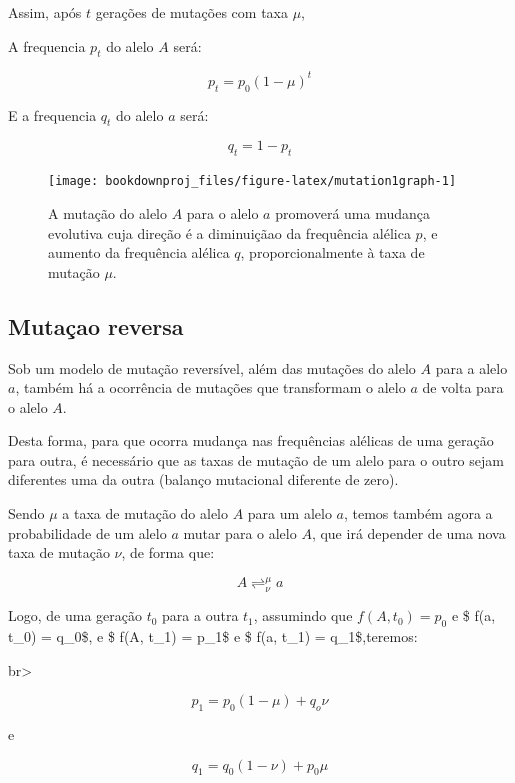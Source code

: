 \documentclass[
]{book}
\begin{document}
Assim, após \(t\) gerações de mutações com taxa \(\mu\),

A frequencia \(p_t\) do alelo \(A\) será:

\[ p_t = p_0 \left( 1 - \mu \right)^t \]

E a frequencia \(q_t\) do alelo \(a\) será:

\[ q_t = 1 - p_t\]

\begin{figure}

{\centering \texttt{[image: bookdownproj\_files/figure-latex/mutation1graph-1]} 

}

\caption{A mutação do alelo $A$ para o alelo $a$ promoverá uma mudança evolutiva cuja direção é a diminuiçãao da frequência alélica $p$, e aumento da frequência alélica $q$,  proporcionalmente à taxa de mutação $μ$.}\label{fig:mutation1graph}
\end{figure}

\hypertarget{mutauxe7ao-reversa}{%
\subsection{Mutaçao reversa}\label{mutauxe7ao-reversa}}

Sob um modelo de mutação reversível, além das mutações do alelo \(A\) para a alelo \(a\), também há a ocorrência de mutações que transformam o alelo \(a\) de volta para o alelo \(A\).

Desta forma, para que ocorra mudança nas frequências alélicas de uma geração para outra, é necessário que as taxas de mutação de um alelo para o outro sejam diferentes uma da outra (balanço mutacional diferente de zero).

Sendo \(\mu\) a taxa de mutação do alelo \(A\) para um alelo \(a\), temos também agora a probabilidade de um alelo \(a\) mutar para o alelo \(A\), que irá depender de uma nova taxa de mutação \(\nu\), de forma que:

\[A \mathrel{\mathop{\rightleftharpoons}^{\mu}_{\nu}} a\]

Logo, de uma geração \(t_0\) para a outra \(t_1\), assumindo que \(f(A, t_0) = p_0\) e \$ f(a, t\_0) = q\_0\$, e \$ f(A, t\_1) = p\_1\$ e \$ f(a, t\_1) = q\_1\$,teremos:

br\textgreater{}

\[ p_1 = p_0(1- \mu) + q_o \nu\]

e

\[ q_1 = q_0(1- \nu) + p_0 \mu\]
\end{document}
